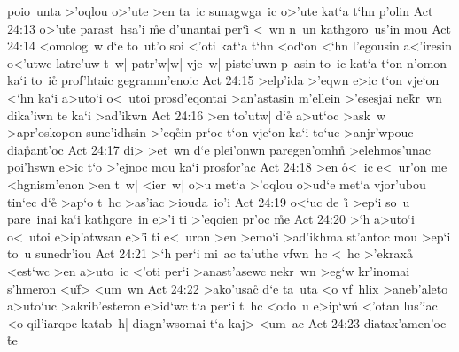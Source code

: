poio~unta
>'oqlou
o>'ute
>en
ta~ic
sunagwga~ic
o>'ute
kat`a
t`hn
p'olin\bibvsend
\vs Act 24:13
o>'u\r{t}e
parast~hsa'i
\r{m}e
d'unantai
per`i\r{}
<~wn
n~un
kathgoro~us'in
mou\bibvsend
\vs Act 24:14
<omolog~w
d`e
to~ut'o
soi
<'oti
kat`a
t`hn
<od`on
<`hn
l'egousin
a<'iresin
o<'utwc
latre'uw
t~w|
patr'w|w|
vje~w|
piste'uwn
p~asin
to~ic
kat`a
t`on
n'omon
ka`i
to~i\r{c}
prof'htaic
gegramm'enoic\bibvsend
\vs Act 24:15
>elp'ida
>'eqwn
e>ic
t`on
vje`on
<`hn
ka`i
a>uto`i
o<~utoi
prosd'eqontai
>an'astasin
m'ellein
>'esesjai
ne\r{k}r~wn
dika'iwn
te
ka`i
>ad'ikwn\bibvsend
\vs Act 24:16
>en
to'utw|
d`e\r{}
a>ut`oc
>ask~w
>apr'oskopon
sune'idhsin
>'eq\r{e}in
pr`oc
t`on
vje`on
ka`i
to`uc
>anjr'wpouc
dia\r{p}ant'oc\bibvsend
{}
\vs Act 24:17
di>
>et~wn
d`e
plei'onwn
paregen'omhn\r{}
>elehmos'unac
poi'hswn
e>ic
t`o
>'ejnoc
mou
ka`i
prosfor'ac\bibvsend
\vs Act 24:18
>en
\r{o}<~ic
e<~ur'on
me
<hgnism'enon
>en
t~w|
<ier~w|
o>u
met`a
>'oqlou
o>ud`e
met`a
vjor'ubou
tin`ec
d`e\r{}
>ap`o
t~hc
>as'iac
>iouda~io'i\bibvsend
\vs Act 24:19
o<`uc
de~i\r{}
>ep`i
so~u
pare~inai
ka`i
kathgore~in
e>'i
ti
>'eqoien
pr'oc
\r{m}e\bibvsend
{}
\vs Act 24:20
>`h
a>uto`i
o<~utoi
e>ip'atwsan
e>'i\r{}
ti
e<~uron
>en
>emo`i
>ad'ikhma
st'antoc
mou
>ep`i
to~u
sunedr'iou\bibvsend
\vs Act 24:21
>`h
per`i
mi~ac
ta'uthc
vfwn~hc
<~hc
>'ekraxa\r{}
<est`wc
>en
a>uto~ic
<'oti
per`i
>anast'asewc
nekr~wn
>eg`w
kr'inomai
s'hmeron
<u\r{f}>
<um~wn\bibvsend
\vs Act 24:22
>ako'usac\r{}
d`e
ta~uta
<o
vf~hlix
>aneb'aleto
a>uto`uc
>akrib'esteron
e>id`wc
t`a
per`i
t~hc
<odo~u
e>ip`w\r{n}
<'otan
lus'iac
<o
qil'iarqoc
katab~h|
diagn'wsomai
t`a
kaj>
<um~ac\bibvsend
\vs Act 24:23
diatax'amen'oc
\r{t}e
